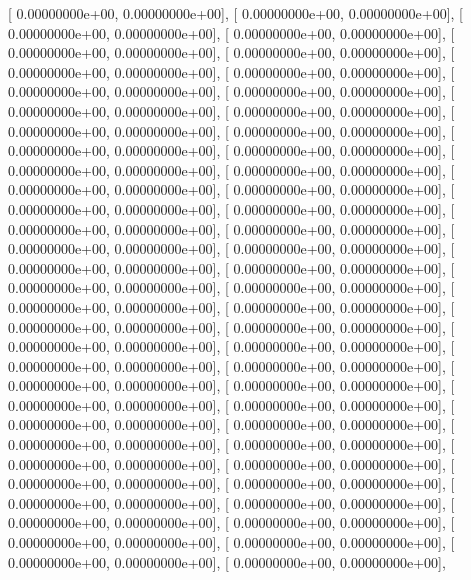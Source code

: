 \documentclass{article}
\begin{document}
       [  0.00000000e+00,   0.00000000e+00],
       [  0.00000000e+00,   0.00000000e+00],
       [  0.00000000e+00,   0.00000000e+00],
       [  0.00000000e+00,   0.00000000e+00],
       [  0.00000000e+00,   0.00000000e+00],
       [  0.00000000e+00,   0.00000000e+00],
       [  0.00000000e+00,   0.00000000e+00],
       [  0.00000000e+00,   0.00000000e+00],
       [  0.00000000e+00,   0.00000000e+00],
       [  0.00000000e+00,   0.00000000e+00],
       [  0.00000000e+00,   0.00000000e+00],
       [  0.00000000e+00,   0.00000000e+00],
       [  0.00000000e+00,   0.00000000e+00],
       [  0.00000000e+00,   0.00000000e+00],
       [  0.00000000e+00,   0.00000000e+00],
       [  0.00000000e+00,   0.00000000e+00],
       [  0.00000000e+00,   0.00000000e+00],
       [  0.00000000e+00,   0.00000000e+00],
       [  0.00000000e+00,   0.00000000e+00],
       [  0.00000000e+00,   0.00000000e+00],
       [  0.00000000e+00,   0.00000000e+00],
       [  0.00000000e+00,   0.00000000e+00],
       [  0.00000000e+00,   0.00000000e+00],
       [  0.00000000e+00,   0.00000000e+00],
       [  0.00000000e+00,   0.00000000e+00],
       [  0.00000000e+00,   0.00000000e+00],
       [  0.00000000e+00,   0.00000000e+00],
       [  0.00000000e+00,   0.00000000e+00],
       [  0.00000000e+00,   0.00000000e+00],
       [  0.00000000e+00,   0.00000000e+00],
       [  0.00000000e+00,   0.00000000e+00],
       [  0.00000000e+00,   0.00000000e+00],
       [  0.00000000e+00,   0.00000000e+00],
       [  0.00000000e+00,   0.00000000e+00],
       [  0.00000000e+00,   0.00000000e+00],
       [  0.00000000e+00,   0.00000000e+00],
       [  0.00000000e+00,   0.00000000e+00],
       [  0.00000000e+00,   0.00000000e+00],
       [  0.00000000e+00,   0.00000000e+00],
       [  0.00000000e+00,   0.00000000e+00],
       [  0.00000000e+00,   0.00000000e+00],
       [  0.00000000e+00,   0.00000000e+00],
       [  0.00000000e+00,   0.00000000e+00],
       [  0.00000000e+00,   0.00000000e+00],
       [  0.00000000e+00,   0.00000000e+00],
       [  0.00000000e+00,   0.00000000e+00],
       [  0.00000000e+00,   0.00000000e+00],
       [  0.00000000e+00,   0.00000000e+00],
       [  0.00000000e+00,   0.00000000e+00],
       [  0.00000000e+00,   0.00000000e+00],
       [  0.00000000e+00,   0.00000000e+00],
       [  0.00000000e+00,   0.00000000e+00],
       [  0.00000000e+00,   0.00000000e+00],
       [  0.00000000e+00,   0.00000000e+00],
       [  0.00000000e+00,   0.00000000e+00],
       [  0.00000000e+00,   0.00000000e+00],
       [  0.00000000e+00,   0.00000000e+00],
       [  0.00000000e+00,   0.00000000e+00],
\end{document}
